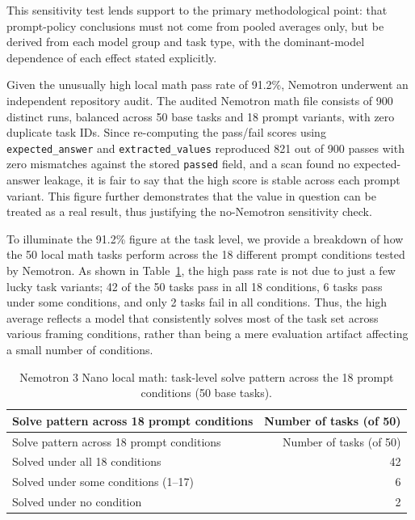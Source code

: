 \documentclass{llncs}
\begin{document}
This sensitivity test lends support to the primary methodological point: that prompt-policy conclusions must not come from pooled averages only, but be derived from each model group and task type, with the dominant-model dependence of each effect stated explicitly.

Given the unusually high local math pass rate of 91.2\%, Nemotron underwent an independent repository audit. The audited Nemotron math file consists of 900 distinct runs, balanced across 50 base tasks and 18 prompt variants, with zero duplicate task IDs. Since re-computing the pass/fail scores using \texttt{expected\_answer} and \texttt{extracted\_values} reproduced 821 out of 900 passes with zero mismatches against the stored \texttt{passed} field, and a scan found no expected-answer leakage, it is fair to say that the high score is stable across each prompt variant. This figure further demonstrates that the value in question can be treated as a real result, thus justifying the no-Nemotron sensitivity check.

To illuminate the 91.2\% figure at the task level, we provide a breakdown of how the 50 local math tasks perform across the 18 different prompt conditions tested by Nemotron. As shown in Table~\ref{tab:nemotron-task-summary}, the high pass rate is not due to just a few lucky task variants; 42 of the 50 tasks pass in all 18 conditions, 6 tasks pass under some conditions, and only 2 tasks fail in all conditions. Thus, the high average reflects a model that consistently solves most of the task set across various framing conditions, rather than being a mere evaluation artifact affecting a small number of conditions.

\begin{longtable}[]{@{}lr@{}}
\caption{Nemotron 3 Nano local math: task-level solve pattern across the 18 prompt conditions (50 base tasks).}\label{tab:nemotron-task-summary}\tabularnewline
\toprule\noalign{}
Solve pattern across 18 prompt conditions & Number of tasks (of 50) \\
\midrule\noalign{}
\endfirsthead
\toprule\noalign{}
Solve pattern across 18 prompt conditions & Number of tasks (of 50) \\
\midrule\noalign{}
\endhead
\bottomrule\noalign{}
\endlastfoot
Solved under all 18 conditions & 42 \\
Solved under some conditions (1--17) & 6 \\
Solved under no condition & 2 \\
\end{longtable}
\end{document}
